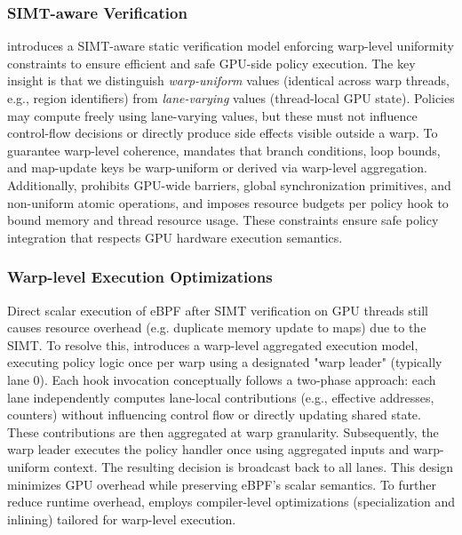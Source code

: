 \subsubsection{SIMT-aware Verification}

\sys introduces a SIMT-aware static verification model enforcing warp-level uniformity constraints to ensure efficient and safe GPU-side policy execution.
The key insight is that we distinguish \emph{warp-uniform} values (identical across warp threads, e.g., region identifiers) from \emph{lane-varying} values (thread-local GPU state). Policies may compute freely using lane-varying values, but these must not influence control-flow decisions or directly produce side effects visible outside a warp. To guarantee warp-level coherence, \sys mandates that branch conditions, loop bounds, and map-update keys be warp-uniform or derived via warp-level aggregation. Additionally, \sys prohibits GPU-wide barriers, global synchronization primitives, and non-uniform atomic operations, and imposes resource budgets per policy hook to bound memory and thread resource usage. These constraints ensure safe policy integration that respects GPU hardware execution semantics.

\subsubsection{Warp-level Execution Optimizations}

Direct scalar execution of eBPF after SIMT verification on GPU threads still causes resource overhead (e.g. duplicate memory update to maps) due to the SIMT. To resolve this, \sys introduces a warp-level aggregated execution model, executing policy logic once per warp using a designated "warp leader" (typically lane 0). Each hook invocation conceptually follows a two-phase approach: each lane independently computes lane-local contributions (e.g., effective addresses, counters) without influencing control flow or directly updating shared state. These contributions are then aggregated at warp granularity. Subsequently, the warp leader executes the policy handler once using aggregated inputs and warp-uniform context. The resulting decision is broadcast back to all lanes. This design minimizes GPU overhead while preserving eBPF's scalar semantics. To further reduce runtime overhead, \sys employs compiler-level optimizations (specialization and inlining) tailored for warp-level execution.
